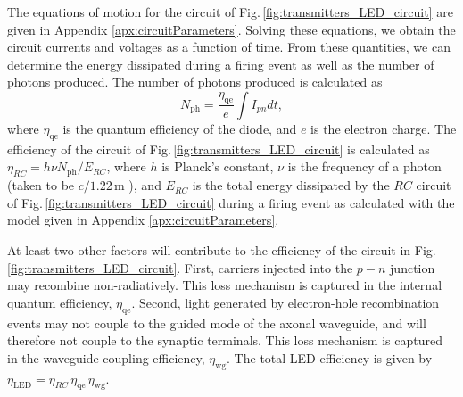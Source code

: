 \documentclass[twocolumn]{article}
\begin{document}
The equations of motion for the circuit of Fig.\,\ref{fig:transmitters_LED_circuit} are given in Appendix \ref{apx:circuitParameters}. Solving these equations, we obtain the circuit currents and voltages as a function of time. From these quantities, we can determine the energy dissipated during a firing event as well as the number of photons produced. The number of photons produced is calculated as 
\begin{equation}
\label{eq:Nph}
N_{\mathrm{ph}} = \frac{\eta_{\mathrm{qe}}}{e}\int I_{pn} dt, 
\end{equation}
where $\eta_{\mathrm{qe}}$ is the quantum efficiency of the diode, and $e$ is the electron charge. The efficiency of the circuit of Fig.\,\ref{fig:transmitters_LED_circuit} is calculated as $
\eta_{RC} = h \nu N_{\mathrm{ph}} / E_{RC}$, where $h$ is Planck's constant, $\nu$ is the frequency of a photon (taken to be $c/1.22$\,\textmu m \cite{buch2017}), and $E_{RC}$ is the total energy dissipated by the $RC$ circuit of Fig.\,\ref{fig:transmitters_LED_circuit} during a firing event as calculated with the model given in Appendix \ref{apx:circuitParameters}. 

At least two other factors will contribute to the efficiency of the circuit in Fig.\,\ref{fig:transmitters_LED_circuit}. First, carriers injected into the $p-n$ junction may recombine non-radiatively. This loss mechanism is captured in the internal quantum efficiency, $\eta_{\mathrm{qe}}$. Second, light generated by electron-hole recombination events may not couple to the guided mode of the axonal waveguide, and will therefore not couple to the synaptic terminals. This loss mechanism is captured in the waveguide coupling efficiency, $\eta_{\mathrm{wg}}$. The total LED efficiency is given by $\eta_{\mathrm{LED}} = \eta_{RC}\,\eta_{\mathrm{qe}}\,\eta_{\mathrm{wg}}$.
\end{document}
